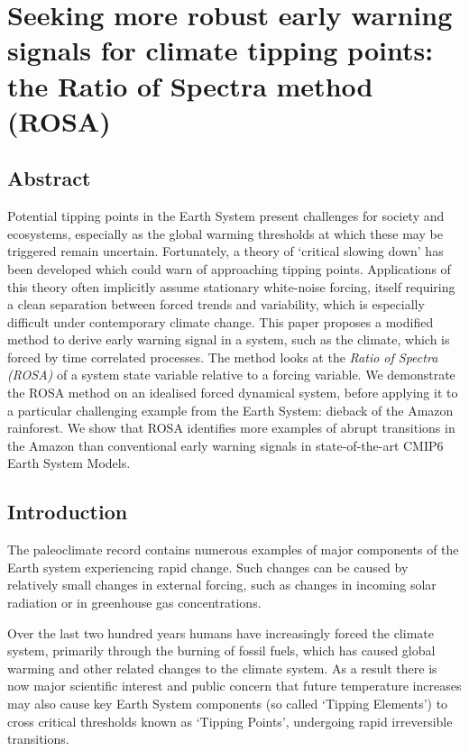 \chapter{Seeking more robust early warning signals for climate tipping points: the Ratio of Spectra method (ROSA)}
\graphicspath{{ROSA/figs}}


\section{Abstract}
Potential tipping points in the Earth System present challenges for society and 
ecosystems, especially as the global warming thresholds at which these may be triggered remain uncertain. 
Fortunately, a theory of `critical slowing down' has been developed which could warn of approaching tipping points. 
Applications of this theory often implicitly assume stationary white-noise forcing,  itself requiring a clean separation
between forced trends and variability, which is especially difficult under contemporary climate change. 
This paper proposes a modified method to derive early warning signal in a 
system, such as the climate, which is forced by time correlated processes. 
The method looks at the \emph{Ratio of Spectra (ROSA)} of a system state variable relative to a forcing variable.   
We demonstrate the ROSA method on an idealised forced dynamical system, before applying it 
to a particular challenging example from the Earth System: dieback of the Amazon rainforest.
We show that ROSA identifies more examples of abrupt transitions in the Amazon than conventional early warning signals in state-of-the-art CMIP6 Earth System Models.


\section{Introduction}\label{sec:introduction}
The paleoclimate record contains numerous examples\cite{Brovkin2021} of 
major components of the Earth system experiencing rapid 
change. Such changes can be caused by 
relatively small changes in external forcing, such as changes in incoming
solar radiation or in greenhouse gas concentrations.

Over the last two hundred years humans have increasingly forced the climate system, 
primarily through the burning of fossil fuels,
which has caused global warming and other related changes to the climate
system. As a result there is now major scientific interest and public 
concern\cite{Lenton2019a,Steffen2018,Ritchie2021} that future 
temperature increases may also cause key
Earth System components (so called `Tipping Elements')  to cross 
critical thresholds known as `Tipping Points', undergoing rapid 
irreversible transitions\cite{Lenton2008}. 

